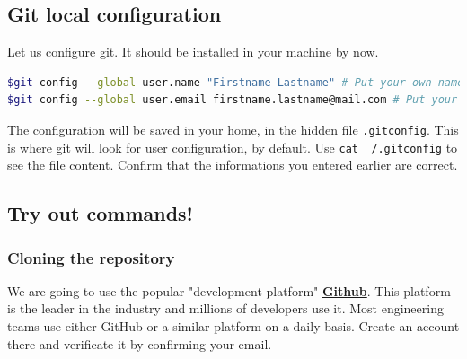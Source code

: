 \documentclass[12pt]{article}
\let\oldhref\href
\renewcommand{\href}[2]{\oldhref{#1}{\bfseries#2}}
\begin{document}
%
%
%

\subsection{Git local configuration}

Let us configure git. It should be installed in your machine by now.

\begin{lstlisting}[language=bash]
$git config --global user.name "Firstname Lastname" # Put your own name here and do not forget the quotes!
$git config --global user.email firstname.lastname@mail.com # Put your own name and email here
\end{lstlisting}

The configuration will be saved in your home, in the hidden file \texttt{.gitconfig}. This is where git will look for user configuration, by default. Use \texttt{cat ~/.gitconfig} to see the file content. Confirm that the informations you entered earlier are correct.

\subsection{Try out commands!}

\subsubsection{Cloning the repository}

We are going to use the popular "development platform" \href{https://github.com/}{Github}. This platform is the leader in the industry and millions of developers use it. Most engineering teams use either GitHub or a similar platform on a daily basis.
Create an account there and verificate it by confirming your email.
\end{document}
